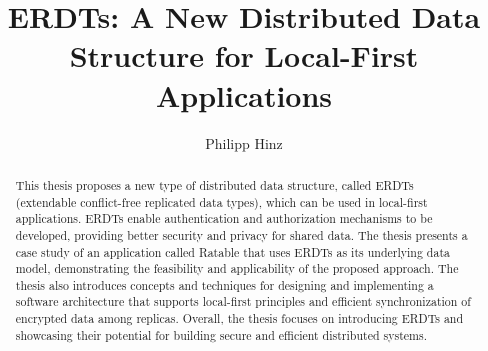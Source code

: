 \documentclass[
	english,
	ruledheaders=section,   %
	class=report,		    %
	thesis={type=bachelor}, %
	accentcolor=9c,			%
	custommargins=true,    %
	marginpar=false,        %
	parskip=half-,          %
	fontsize=11pt,          %
]{tudapub}
\begin{document}

\title{ERDTs: A New Distributed Data Structure for Local-First Applications}
\author[P. Hinz]{Philipp Hinz} %



\submissiondate{\today}
\examdate{\today}

\maketitle

\affidavit

\tableofcontents

\begin{abstract}
This thesis proposes a new type of distributed data structure, called ERDTs (extendable conflict-free replicated data types), which can be used in local-first applications. ERDTs enable authentication and authorization mechanisms to be developed, providing better security and privacy for shared data. The thesis presents a case study of an application called Ratable that uses ERDTs as its underlying data model, demonstrating the feasibility and applicability of the proposed approach. The thesis also introduces concepts and techniques for designing and implementing a software architecture that supports local-first principles and efficient synchronization of encrypted data among replicas. Overall, the thesis focuses on introducing ERDTs and showcasing their potential for building secure and efficient distributed systems.
\end{abstract}
\end{document}
